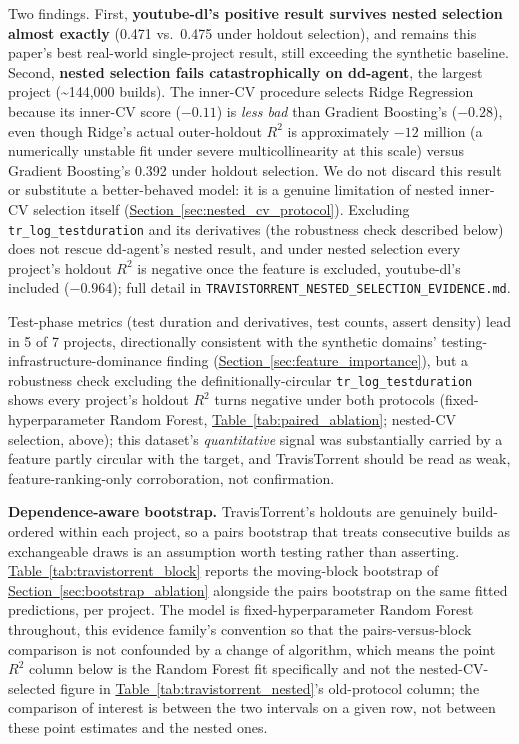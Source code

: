 \documentclass[technologies,article,submit,pdftex,moreauthors]{Definitions/mdpi}
\begin{document}
Two findings. First, \textbf{youtube-dl's positive result survives nested selection almost exactly} (0.471 vs.~0.475 under holdout selection), and remains this paper's best real-world single-project result, still exceeding the synthetic baseline. Second, \textbf{nested selection fails catastrophically on dd-agent}, the largest project (\textasciitilde144,000 builds). The inner-CV procedure selects Ridge Regression because its inner-CV score (\(-0.11\)) is \emph{less bad} than Gradient Boosting's (\(-0.28\)), even though Ridge's actual outer-holdout \(R^2\) is approximately \(-12\) million (a numerically unstable fit under severe multicollinearity at this scale) versus Gradient Boosting's 0.392 under holdout selection. We do not discard this result or substitute a better-behaved model: it is a genuine limitation of nested inner-CV selection itself (\hyperref[sec:nested_cv_protocol]{Section~\ref*{sec:nested_cv_protocol}}). Excluding \texttt{tr\_log\_testduration} and its derivatives (the robustness check described below) does not rescue dd-agent's nested result, and under nested selection every project's holdout \(R^2\) is negative once the feature is excluded, youtube-dl's included (\(-0.964\)); full detail in \texttt{TRAVISTORRENT\_NESTED\_SELECTION\_EVIDENCE.md}.

Test-phase metrics (test duration and derivatives, test counts, assert density) lead in 5 of 7 projects, directionally consistent with the synthetic domains' testing-infrastructure-dominance finding (\hyperref[sec:feature_importance]{Section~\ref*{sec:feature_importance}}), but a robustness check excluding the definitionally-circular \texttt{tr\_log\_testduration} shows every project's holdout \(R^2\) turns negative under both protocols (fixed-hyperparameter Random Forest, \hyperref[tab:paired_ablation]{Table~\ref*{tab:paired_ablation}}; nested-CV selection, above); this dataset's \emph{quantitative} signal was substantially carried by a feature partly circular with the target, and TravisTorrent should be read as weak, feature-ranking-only corroboration, not confirmation.

\textbf{Dependence-aware bootstrap.} TravisTorrent's holdouts are genuinely build-ordered within each project, so a pairs bootstrap that treats consecutive builds as exchangeable draws is an assumption worth testing rather than asserting. \hyperref[tab:travistorrent_block]{Table~\ref*{tab:travistorrent_block}} reports the moving-block bootstrap of \hyperref[sec:bootstrap_ablation]{Section~\ref*{sec:bootstrap_ablation}} alongside the pairs bootstrap on the same fitted predictions, per project. The model is fixed-hyperparameter Random Forest throughout, this evidence family's convention so that the pairs-versus-block comparison is not confounded by a change of algorithm, which means the point \(R^2\) column below is the Random Forest fit specifically and not the nested-CV-selected figure in \hyperref[tab:travistorrent_nested]{Table~\ref*{tab:travistorrent_nested}}'s old-protocol column; the comparison of interest is between the two intervals on a given row, not between these point estimates and the nested ones.
\end{document}

